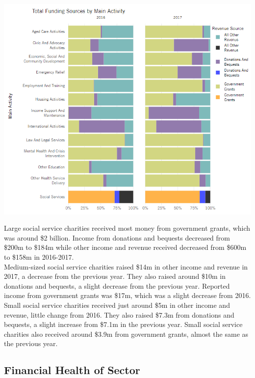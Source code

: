 \documentclass[
  11pt,
]{article}
\let\origfigure\figure
\let\endorigfigure\endfigure
\renewenvironment{figure}[1][2] {
    \expandafter\origfigure\expandafter[H]
} {
    \endorigfigure
}
\begin{document}
\begin{figure}
\centering
\includegraphics{Fig5 Funding Props.PNG}
\caption{Proportion of Funding Sources per Main Activity}
\end{figure}

Large social service charities received most money from government grants, which was around \$2 billion. Income from donations and bequests decreased from \$200m to \$184m while other income and revenue received decreased from \$600m to \$158m in 2016-2017.\\
Medium-sized social service charities raised \$14m in other income and revenue in 2017, a decrease from the previous year. They also raised around \$10m in donations and bequests, a slight decrease from the previous year. Reported income from government grants was \$17m, which was a slight decrease from 2016.\\
Small social service charities received just around \$5m in other income and revenue, little change from 2016. They also raised \$7.3m from donations and bequests, a slight increase from \$7.1m in the previous year. Small social service charities also received around \$3.9m from government grants, almost the same as the previous year.
\newpage

\hypertarget{financial-health-of-sector}{%
\subsection{Financial Health of Sector}\label{financial-health-of-sector}}
\end{document}
